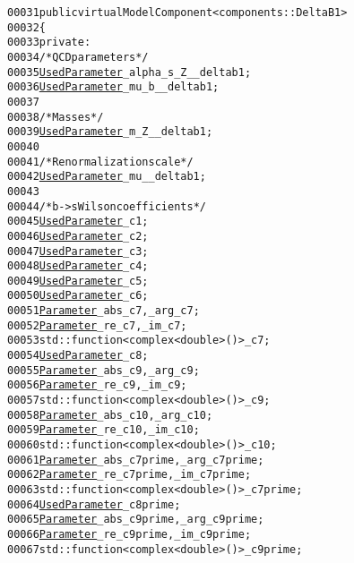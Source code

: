\begin{footnotesize}
\begin{alltt}
00031         \textcolor{keyword}{public} \textcolor{keyword}{virtual} ModelComponent<components::DeltaB1>
00032     \{
00033         \textcolor{keyword}{private}:
00034             \textcolor{comment}{/* QCD parameters */}
00035             \hyperlink{classeos_1_1UsedParameter}{UsedParameter} \_alpha\_s\_Z\_\_deltab1;
00036             \hyperlink{classeos_1_1UsedParameter}{UsedParameter} \_mu\_b\_\_deltab1;
00037 
00038             \textcolor{comment}{/* Masses */}
00039             \hyperlink{classeos_1_1UsedParameter}{UsedParameter} \_m\_Z\_\_deltab1;
00040 
00041             \textcolor{comment}{/* Renormalization scale */}
00042             \hyperlink{classeos_1_1UsedParameter}{UsedParameter} \_mu\_\_deltab1;
00043 
00044             \textcolor{comment}{/* b->s Wilson coefficients */}
00045             \hyperlink{classeos_1_1UsedParameter}{UsedParameter} \_c1;
00046             \hyperlink{classeos_1_1UsedParameter}{UsedParameter} \_c2;
00047             \hyperlink{classeos_1_1UsedParameter}{UsedParameter} \_c3;
00048             \hyperlink{classeos_1_1UsedParameter}{UsedParameter} \_c4;
00049             \hyperlink{classeos_1_1UsedParameter}{UsedParameter} \_c5;
00050             \hyperlink{classeos_1_1UsedParameter}{UsedParameter} \_c6;
00051             \hyperlink{classeos_1_1Parameter}{Parameter} \_abs\_c7, \_arg\_c7;
00052             \hyperlink{classeos_1_1Parameter}{Parameter} \_re\_c7, \_im\_c7;
00053             std::function<complex<double> ()> \_c7;
00054             \hyperlink{classeos_1_1UsedParameter}{UsedParameter} \_c8;
00055             \hyperlink{classeos_1_1Parameter}{Parameter} \_abs\_c9, \_arg\_c9;
00056             \hyperlink{classeos_1_1Parameter}{Parameter} \_re\_c9, \_im\_c9;
00057             std::function<complex<double> ()> \_c9;
00058             \hyperlink{classeos_1_1Parameter}{Parameter} \_abs\_c10, \_arg\_c10;
00059             \hyperlink{classeos_1_1Parameter}{Parameter} \_re\_c10, \_im\_c10;
00060             std::function<complex<double> ()> \_c10;
00061             \hyperlink{classeos_1_1Parameter}{Parameter} \_abs\_c7prime, \_arg\_c7prime;
00062             \hyperlink{classeos_1_1Parameter}{Parameter} \_re\_c7prime, \_im\_c7prime;
00063             std::function<complex<double> ()> \_c7prime;
00064             \hyperlink{classeos_1_1UsedParameter}{UsedParameter} \_c8prime;
00065             \hyperlink{classeos_1_1Parameter}{Parameter} \_abs\_c9prime, \_arg\_c9prime;
00066             \hyperlink{classeos_1_1Parameter}{Parameter} \_re\_c9prime, \_im\_c9prime;
00067             std::function<complex<double> ()> \_c9prime;

\end{alltt}
\end{footnotesize}
